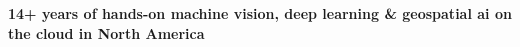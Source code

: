 \onehalfspace
\textbf{\large 14+ years of hands-on machine vision, deep learning \& geospatial ai  on the cloud in North America}
\singlespace

\vspace{0.8cm}
